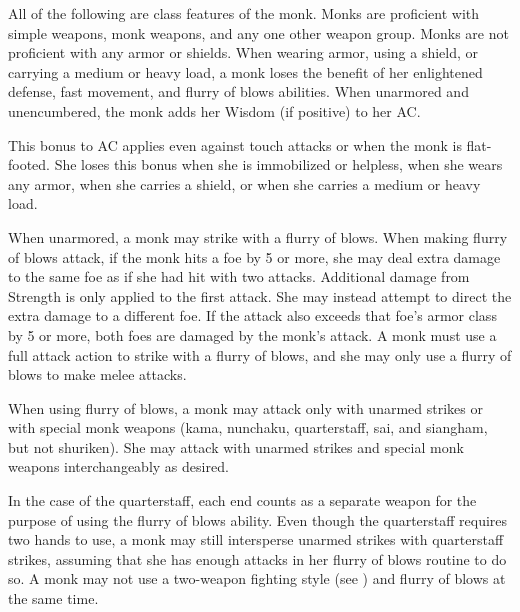 All of the following are class features of the monk.
Monks are proficient with simple weapons, monk weapons,  and any one other weapon group.  Monks are not proficient with any armor or shields. When wearing armor, using a shield, or carrying a medium or heavy load, a monk loses the benefit of her  enlightened defense,  fast movement, and flurry of blows abilities.
   When unarmored and unencumbered, the monk adds her Wisdom (if positive) to her AC.

\par This bonus to AC applies even against touch attacks or when the monk is flat-footed. She loses this bonus when she is immobilized or helpless, when she wears any armor, when she carries a shield, or when she carries a medium or heavy load.

\begin{comment}    %
 \cfnl{\Ki Ward (Ex)}\label{Mnk:Ki Ward (Ex)} When unarmored and unencumbered, a monk gains a \plus1 armor bonus to AC at 2nd level. This bonus increases by 1 for every two monk levels thereafter (\plus2 at 4th, \plus3 at 6th, etc.).

\par The monk loses this bonus when she is
immobilized or helpless, when she wears any armor, when she carries a shield, or when she carries a medium or heavy load.
\end{comment}

   When unarmored, a monk may strike with a flurry of blows. When making flurry of blows attack, if the monk hits a foe by 5 or more, she may deal extra damage to the same foe as if she had hit with two attacks. Additional damage from Strength is only applied to the first attack. She may instead attempt to direct the extra damage to a different foe. If the attack also exceeds that foe's armor class by 5 or more, both foes are damaged by the monk's attack. A monk must use a full attack action to strike with a flurry of blows, and she may only use a flurry of blows to make melee attacks.

\par When using flurry of blows, a monk may attack only with unarmed strikes or with special monk weapons (kama, nunchaku, quarterstaff, sai, and siangham, but not shuriken). She may attack with unarmed strikes and special monk weapons interchangeably as desired.

In the case of the quarterstaff, each end counts as a separate weapon for the purpose of using the flurry of blows ability. Even though the quarterstaff requires two hands to use, a monk may still intersperse unarmed strikes with quarterstaff strikes, assuming that she has enough attacks in her flurry of blows routine to do so. A monk may not use a two-weapon fighting style (see ) and flurry of blows at the same time.

